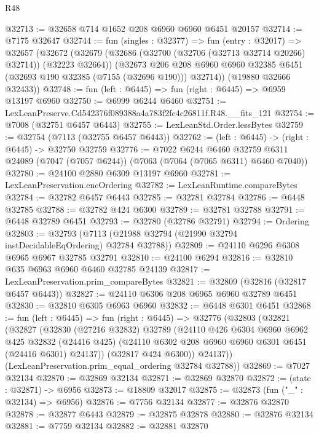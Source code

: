 \begin{lexlean}{R48}
\begin{coremodule}
@32713 := @32658 @714 @1652 @208 @6960 @6960 @6451 @20157
@32714 := @7175 @32647
@32744 := fun (singles : @32377) =>
  fun (entry : @32017) =>
  @32657
    (@32672
      (@32679
        (@32686 (@32700 (@32706 (@32713 @32714 @20266) @32714)) (@32223 @32664))
        (@32673
          @206
          @208
          @6960
          @6960
          @32385
          @6451
          (@32693 @190 @32385 (@7155 (@32696 @190)))
          @32714))
      (@19880 @32666 @32433))
@32748 := fun (left : @6445) => fun (right : @6445) => @6959 @13197 @6960
@32750 := @6999 @6244 @6460
@32751 := LexLeanPreserve.Cd542376f089388a4a783f2fc4c26811f.R48.__fits_121
@32754 := @7008 (@32751 @6457 @6443)
@32755 := LexLeanStd.Order.lessBytes
@32759 := @32754 (@7113 (@32755 @6457 @6443))
@32762 := (left : @6445) -> (right : @6445) -> @32750 @32759
@32776 := @7022
    @6244
    @6460
    @32759
    @6311
    @24089
    (@7047 (@7057 @6244))
    (@7063 (@7064 (@7065 @6311) @6460 @7040))
@32780 := @24100 @2880 @6309 @13197 @6960
@32781 := LexLeanPreservation.encOrdering
@32782 := LexLeanRuntime.compareBytes
@32784 := @32782 @6457 @6443
@32785 := @32781 @32784
@32786 := @6448 @32785
@32788 := @32782 @424 @6300
@32789 := @32781 @32788
@32791 := @6448 @32789 @6451
@32793 := @32780 (@32786 @32791)
@32794 := Ordering
@32803 := @32793 (@7113 (@21988 @32794 (@21990 @32794 instDecidableEqOrdering) @32784 @32788))
@32809 := @24110 @6296 @6308 @6965 @6967 @32785 @32791
@32810 := @24100 @6294
@32816 := @32810 @635 @6963 @6960 @6460 @32785 @24139
@32817 := LexLeanPreservation.prim_compareBytes
@32821 := @32809 (@32816 (@32817 @6457 @6443))
@32827 := @24110 @6306 @208 @6965 @6960 @32789 @6451
@32830 := @32810 @6305 @6963 @6960
@32832 := @6448 @6301 @6451
@32868 := fun (left : @6445) =>
  fun (right : @6445) =>
  @32776
    (@32803
      (@32821
        (@32827
          (@32830
            (@27216 @32832)
            @32789
            (@24110
              @426
              @6304
              @6960
              @6962
              @425
              @32832
              (@24416 @425)
              (@24110 @6302 @208 @6960 @6960 @6301 @6451 (@24416 @6301) @24137))
            (@32817 @424 @6300))
          @24137))
      (LexLeanPreservation.prim_equal_ordering @32784 @32788))
@32869 := @7027 @32134
@32870 := @32869 @32134
@32871 := @32869 @32870
@32872 := (state : @32871) -> @6956
@32873 := @18809 @32017
@32875 := @32873 (fun ("_" : @32134) => @6956)
@32876 := @7756 @32134
@32877 := @32876 @32870
@32878 := @32877 @6443
@32879 := @32875 @32878
@32880 := @32876 @32134
@32881 := @7759 @32134
@32882 := @32881 @32870

\end{coremodule}
\end{lexlean}

